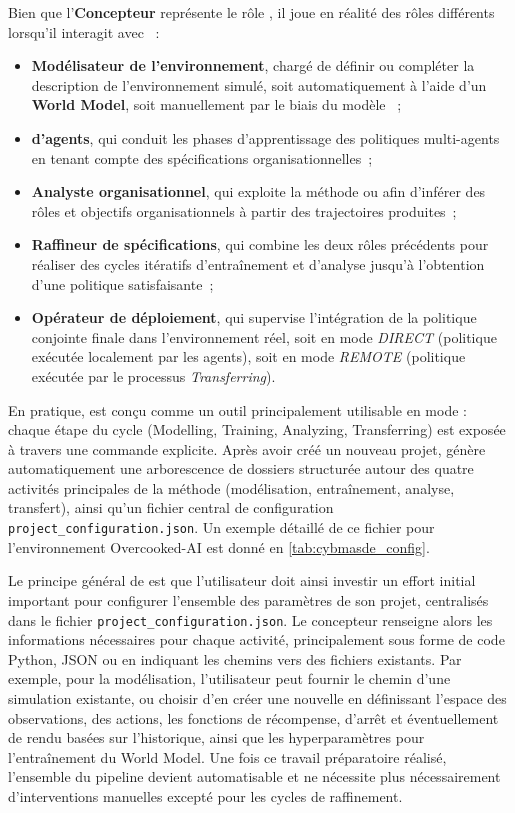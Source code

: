 Bien que l'\textbf{Concepteur} représente le rôle , il joue en réalité des rôles différents lorsqu'il interagit avec ~:
\begin{itemize}
  \item \textbf{Modélisateur de l'environnement}, chargé de définir ou compléter la description de l'environnement simulé, soit automatiquement à l'aide d'un \textbf{World Model}, soit manuellement par le biais du modèle ~;
  \item \textbf{ d'agents}, qui conduit les phases d'apprentissage des politiques multi-agents en tenant compte des spécifications organisationnelles~;
  \item \textbf{Analyste organisationnel}, qui exploite la méthode  ou  afin d'inférer des rôles et objectifs organisationnels à partir des trajectoires produites~;
  \item \textbf{Raffineur de spécifications}, qui combine les deux rôles précédents pour réaliser des cycles itératifs d'entraînement et d'analyse jusqu'à l'obtention d'une politique satisfaisante~;
  \item \textbf{Opérateur de déploiement}, qui supervise l'intégration de la politique conjointe finale dans l'environnement réel, soit en mode \textit{DIRECT} (politique exécutée localement par les agents), soit en mode \textit{REMOTE} (politique exécutée par le processus \textit{Transferring}).
\end{itemize}

En pratique,  est conçu comme un outil principalement utilisable en mode  : chaque étape du cycle  (Modelling, Training, Analyzing, Transferring) est exposée à travers une commande explicite.
%
Après avoir créé un nouveau projet,  génère automatiquement une arborescence de dossiers structurée autour des quatre activités principales de la méthode  (modélisation, entraînement, analyse, transfert), ainsi qu'un fichier central de configuration \texttt{project\_configuration.json}. Un exemple détaillé de ce fichier pour l'environnement Overcooked-AI est donné en \autoref{tab:cybmasde_config}.



Le principe général de  est que l'utilisateur doit ainsi investir un effort initial important pour configurer l'ensemble des paramètres de son projet, centralisés dans le fichier \texttt{project\_configuration.json}.
Le concepteur renseigne alors les informations nécessaires pour chaque activité, principalement sous forme de code Python, JSON ou en indiquant les chemins vers des fichiers existants. Par exemple, pour la modélisation, l'utilisateur peut fournir le chemin d'une simulation existante, ou choisir d'en créer une nouvelle en définissant l'espace des observations, des actions, les fonctions de récompense, d'arrêt et éventuellement de rendu basées sur l'historique, ainsi que les hyperparamètres pour l'entraînement du World Model.
Une fois ce travail préparatoire réalisé, l'ensemble du pipeline devient automatisable et ne nécessite plus nécessairement d'interventions manuelles excepté pour les cycles de raffinement.

